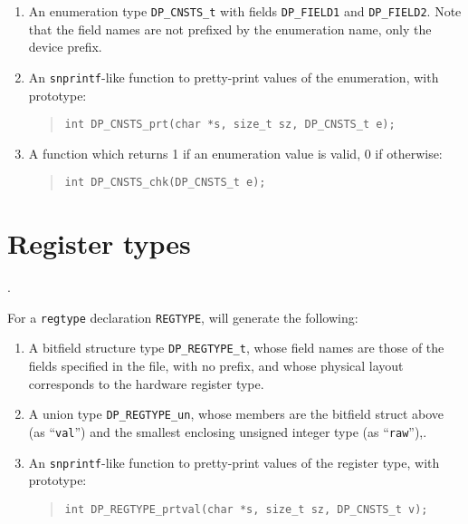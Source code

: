 \documentclass[a4paper,11pt,twoside]{report}
\begin{document}
\begin{enumerate}

\item An enumeration type \texttt{DP\_CNSTS\_t} with fields
  \texttt{DP\_FIELD1} and \texttt{DP\_FIELD2}.  Note that the field
  names are not prefixed by the enumeration name, only the device
  prefix. 

\item An \texttt{snprintf}-like function to pretty-print values of the
  enumeration, with prototype:
  \begin{quote}
    \texttt{int DP\_CNSTS\_prt(char *s, size\_t sz, DP\_CNSTS\_t e);}
  \end{quote}
      
\item A function which returns 1 if an enumeration value is valid, 0
  if otherwise:
  \begin{quote}
    \texttt{int DP\_CNSTS\_chk(DP\_CNSTS\_t e);}
  \end{quote}

\end{enumerate}

\section{Register types}\label{sec:old:c-regtype}. 

For a \texttt{regtype} declaration \texttt{REGTYPE}, \Mac will generate the following:

\begin{enumerate}

\item A bitfield structure type \texttt{DP\_REGTYPE\_t}, whose field
  names are those of the fields specified in the \Mac file, with no
  prefix, and whose physical layout corresponds to the hardware
  register type.

\item A union type \texttt{DP\_REGTYPE\_un}, whose members are the
  bitfield struct above (as ``\texttt{val}'') and the smallest
  enclosing unsigned integer type (as ``\texttt{raw}''),. 

\item An \texttt{snprintf}-like function to pretty-print values of the
  register type, with prototype:
  \begin{quote}
    \texttt{int DP\_REGTYPE\_prtval(char *s, size\_t sz, DP\_CNSTS\_t v);}
  \end{quote}

\end{enumerate}
\end{document}
